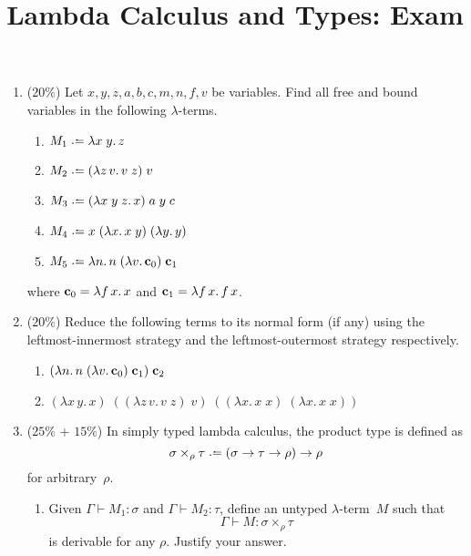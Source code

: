 

\title{Lambda Calculus and Types: Exam}

\maketitle
\begin{enumerate}
  \item ($20\%$)
    Let $x, y, z, a, b, c, m, n, f, v$ be variables.  Find all free and bound
    variables in the following
    $\lambda$-terms.
    \begin{enumerate}
      \item $M_1 \defeq \lambda x\;y.\, z$
      \item $M_2 \defeq (\lambda z\,v.\, v\;z)\;v$
      \item $M_3 \defeq (\lambda x\;y\;z.\,x)\;a\;y\;c$
      \item $M_4 \defeq x\;(\lambda x.\, x\;y)\;(\lambda y.\, y)$ 
      \item $M_5 \defeq \lambda n.\,n\;(\lambda v.\, \bc_0)\;\bc_1$
    \end{enumerate}
    where $\mathbf{c}_0 = \lambda f\,x.\,x$ and $\mathbf{c}_1 = \lambda f\,x.\,f\,x$.
  \item ($20\%$) Reduce the following terms to its normal form (if any) using
    the leftmost-innermost strategy and the leftmost-outermost
    strategy respectively.
    \begin{enumerate}
      \item $(\lambda n.\,n\;(\lambda v.\, \mathbf{c}_0)\;\mathbf{c}_1)\;\mathbf{c}_2$
      \item $(\lambda x\,y.\, x)\;((\lambda z\,v.\, v\;z) \;v)\;((\lambda x.\,
        x\;x)\;(\lambda x.\, x\;x))$
    \end{enumerate}
  \item ($25\%$ + $15\%$) In simply typed lambda calculus, the product
    type is defined as
    \[
      \sigma \times_\rho \tau \defeq (\sigma \to \tau \to \rho) \to \rho
    \]
    for arbitrary~$\rho$. 
    \begin{enumerate}
      \item Given $\Gamma \vdash M_1 : \sigma$ and $\Gamma \vdash M_2 :
        \tau$, define an untyped $\lambda$-term~$M$ such that
        \[
          \Gamma \vdash M : \sigma \times_\rho \tau
        \]
        is derivable for any $\rho$. Justify your answer.


\end{enumerate}
\end{enumerate}
